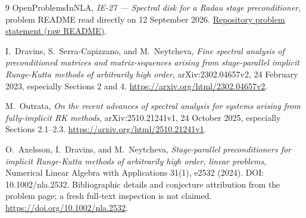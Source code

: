 \documentclass[11pt,letterpaper]{article}
\theoremstyle{remark}
\begin{document}
\begingroup
\small
\begin{thebibliography}{9}
\setlength{\itemsep}{3pt}
OpenProblemsInNLA, \emph{IE-27 --- Spectral disk for a Radau stage preconditioner},
problem README read directly on 12 September 2026.
\href{https://raw.githubusercontent.com/ajt60gaibb/OpenProblemsInNLA/main/linear-systems-and-elimination/IE-27/README.md}{Repository problem statement (raw README)}.

I.~Dravins, S.~Serra-Capizzano, and M.~Neytcheva,
\emph{Fine spectral analysis of preconditioned matrices and matrix-sequences
arising from stage-parallel implicit Runge-Kutta methods of arbitrarily high
order}, arXiv:2302.04657v2, 24 February 2023, especially Sections 2 and 4.
\url{https://arxiv.org/html/2302.04657v2}.

M.~Outrata, \emph{On the recent advances of spectral analysis for systems
arising from fully-implicit RK methods}, arXiv:2510.21241v1, 24 October 2025,
especially Sections 2.1--2.3.
\url{https://arxiv.org/html/2510.21241v1}.

O.~Axelsson, I.~Dravins, and M.~Neytcheva,
\emph{Stage-parallel preconditioners for implicit Runge-Kutta methods of
arbitrarily high order, linear problems}, Numerical Linear Algebra with
Applications 31(1), e2532 (2024). DOI: 10.1002/nla.2532.
Bibliographic details and conjecture attribution from the problem page;
a fresh full-text inspection is not claimed.
\url{https://doi.org/10.1002/nla.2532}.
\end{thebibliography}
\endgroup
\end{document}
